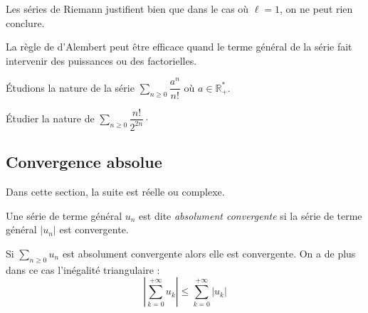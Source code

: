 \documentclass[a4paper,10pt]{report}
\newcommand{\Sum}[2]{\ensuremath{\textstyle{\sum\limits_{#1}^{#2}}}}
\begin{document}
\begin{rems}
\item Les séries de Riemann justifient bien que dans le cas où $\ell=1$, on ne peut rien conclure.
\item La règle de d'Alembert peut être efficace quand le terme général de la série fait intervenir des puissances ou des factorielles.
\end{rems}

\begin{ex} Étudions la nature de la série $\Sum{n \geq 0}{} \dfrac{a^n}{n!}$ où $a \in \mathbb{R}_+^{*}$.

\vspace{3cm}
\end{ex}

\begin{exa} Étudier la nature de $\Sum{n \geq 0}{} \dfrac{n!}{2^{2n}}\cdot$
\end{exa}
\subsection{Convergence absolue}

\noindent Dans cette section, la suite est réelle ou complexe.

\begin{defin} Une série de terme général $u_n$ est dite \textit{absolument convergente} si la série de terme général $\vert u_n \vert$ est convergente.
\end{defin}

\begin{thm} Si $\Sum{n \geq 0}{} u_n$ est absolument convergente alors elle est convergente. On a de plus dans ce cas l'inégalité triangulaire :
$$ \left\vert \sum_{k=0}^{+ \infty} u_k \right\vert \leq \sum_{k=0}^{+ \infty} \vert u_k \vert$$
\end{thm}
\end{document}
